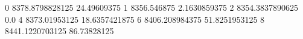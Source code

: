 0 8378.8798828125 24.49609375
1 8356.546875 2.1630859375
2 8354.3837890625 0.0
4 8373.01953125 18.6357421875
6 8406.208984375 51.8251953125
8 8441.1220703125 86.73828125
